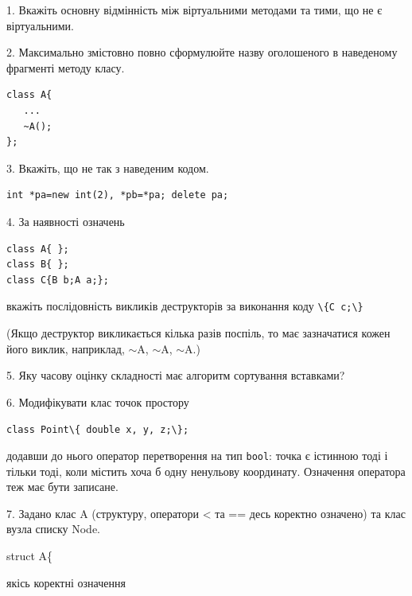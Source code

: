 \documentclass[12pt, ukrainian]{article}
\def\code#1{\Verb!#1!}
\begin{document}
{%
1. Вкажіть основну відмінність між віртуальними методами та тими, що не є віртуальними.%
\par
\vspace{2mm}
2. Максимально змістовно повно сформулюйте назву оголошеного в наведеному фрагменті методу класу.
\vspace{-3mm}
\begin{verbatim}class A{
   ...
   ~A();
};\end{verbatim}
\vspace{-3mm}
\par
\vspace{2mm}
3. Вкажіть, що не так з наведеним кодом.
\vspace{-3mm}
\begin{verbatim}int *pa=new int(2), *pb=*pa; delete pa;\end{verbatim}
\vspace{-3mm}
\par
\vspace{2mm}
4. За наявності означень
\vspace{-3mm}
\begin{verbatim}
class A{ };
class B{ };
class C{B b;A a;};\end{verbatim}
\vspace{-3mm}
вкажіть послідовність викликів деструкторів за виконання коду \code{\{C c;\}} 

(Якщо деструктор викликається кілька разів поспіль, то має зазначатися кожен його виклик, наприклад, $\sim$A, $\sim$A, $\sim$A.)

\vspace{2mm}
5. Яку часову оцінку складності має алгоритм сортування вставками?
\par
\vspace{2mm}
6. Модифікувати клас точок простору 

\qquad\code{class Point\{ double x, y, z;\};}


додавши до нього оператор перетворення на тип \code{bool}: точка є істинною тоді і тільки тоді, коли містить хоча б одну ненульову координату. Означення оператора теж має бути записане.%
\par
\vspace{2mm}
7. 
Задано клас A (структуру, оператори < та == десь коректно означено) та клас вузла списку Node.

struct A\{

\quad  якісь коректні означення 

}
\end{document}

